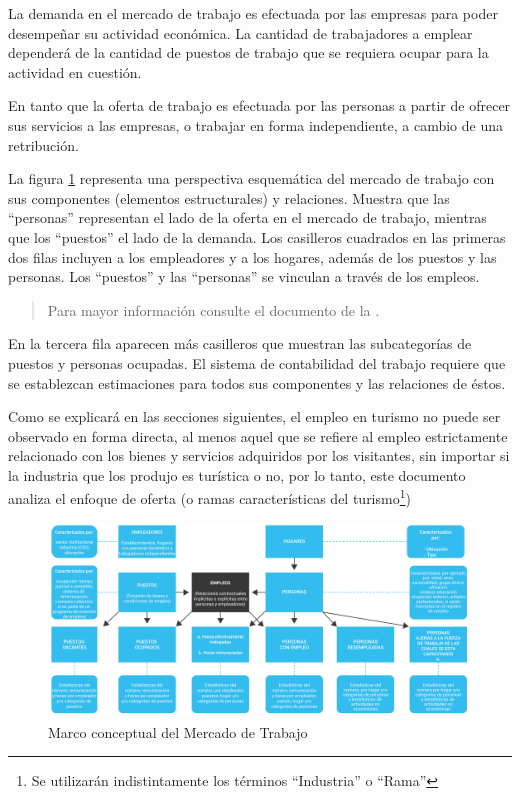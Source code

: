 \documentclass[
  openany]{book}
\begin{document}
La demanda en el mercado de trabajo es efectuada por las empresas para poder desempeñar su actividad económica. La cantidad de trabajadores a emplear dependerá de la cantidad de puestos de trabajo que se requiera ocupar para la actividad en cuestión.

En tanto que la oferta de trabajo es efectuada por las personas a partir de ofrecer sus servicios a las empresas, o trabajar en forma independiente, a cambio de una retribución.

La figura \ref{fig:empleooit} representa una perspectiva esquemática del mercado de trabajo con sus componentes (elementos estructurales) y relaciones. Muestra que las ``personas'' representan el lado de la oferta en el mercado de trabajo, mientras que los ``puestos'' el lado de la demanda. Los casilleros cuadrados en las primeras dos filas incluyen a los empleadores y a los hogares, además de los puestos y las personas. Los ``puestos'' y las ``personas'' se vinculan a través de los empleos.

\begin{quote}
Para mayor información consulte el documento de la \citet{oit2014}.
\end{quote}

En la tercera fila aparecen más casilleros que muestran las subcategorías de puestos y personas ocupadas. El sistema de contabilidad del trabajo requiere que se establezcan estimaciones para todos sus componentes y las relaciones de éstos.

Como se explicará en las secciones siguientes, el empleo en turismo no puede ser observado en forma directa, al menos aquel que se refiere al empleo estrictamente relacionado con los bienes y servicios adquiridos por los visitantes, sin importar si la industria que los produjo es turística o no, por lo tanto, este documento analiza el enfoque de oferta (o ramas características del turismo\footnote{Se utilizarán indistintamente los términos ``Industria'' o ``Rama''})

\begin{figure}

{\centering \includegraphics[width=1\linewidth]{imagenes/figura2.1} 

}

\caption{Marco conceptual del Mercado de Trabajo}\label{fig:empleooit}
\end{figure}
\end{document}
